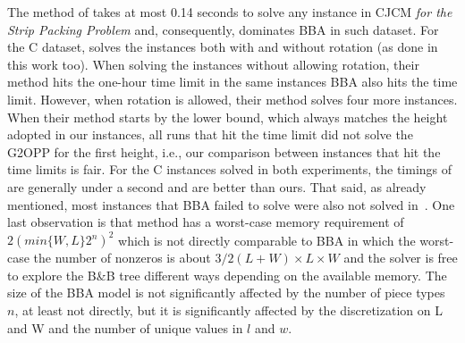 The method of \citet{fleszar:2016} takes at most 0.14 seconds to solve any instance in CJCM \emph{for the Strip Packing Problem} and, consequently, dominates BBA in such dataset.
For the C dataset, \citet{fleszar:2016} solves the instances both with and without rotation (as done in this work too).
When solving the instances without allowing rotation, their method hits the one-hour time limit in the same instances BBA also hits the time limit.
However, when rotation is allowed, their method solves four more instances.
When their method starts by the lower bound, which always matches the height adopted in our instances, all runs that hit the time limit did not solve the G2OPP for the first height, i.e., our comparison between instances that hit the time limits is fair.
For the C instances solved in both experiments, the timings of \citet{fleszar:2016} are generally under a second and are better than ours.
That said, as already mentioned, most instances that BBA failed to solve were also not solved in~\citet{fleszar:2016}.
One last observation is that \citet{fleszar:2016} method has a worst-case memory requirement of \(2(min\{W,L\}2^n)^2\) which is not directly comparable to BBA in which the worst-case the number of nonzeros is about \(3/2(L + W) \times L \times W\) and the solver is free to explore the B\&B tree different ways depending on the available memory.
The size of the BBA model is not significantly affected by the number of piece types~\(n\), at least not directly, but it is significantly affected by the discretization on L and W and the number of unique values in \(l\) and \(w\).

